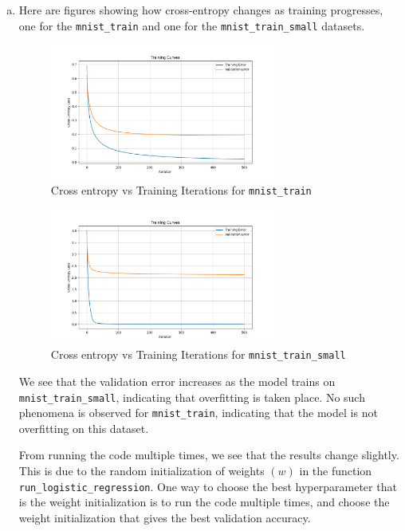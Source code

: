 \documentclass{article}
\begin{document}
\begin{enumerate}[3.1]
\begin{enumerate}[(a)]
        \item Here are figures showing how cross-entropy changes as training progresses, one for the \texttt{mnist\_train} and one for the \texttt{mnist\_train\_small} datasets.
        
        \begin{figure}[H]
            \centering
            \includegraphics[width=0.7\textwidth]{../figures/mnist_train.png}
            \caption{Cross entropy vs Training Iterations for \texttt{mnist\_train}}
            \label{fig:q3b_mnist_train_cross_entropy}
        \end{figure}

        \begin{figure}[H]
            \centering
            \includegraphics[width=0.7\textwidth]{../figures/mnist_train_small.png}
            \caption{Cross entropy vs Training Iterations for \texttt{mnist\_train\_small}}
            \label{fig:q3b_mnist_train_small_cross_entropy}
        \end{figure}

        We see that the validation error increases as the model trains on \texttt{mnist\_train\_small}, indicating that overfitting is taken place. No such phenomena is observed for \texttt{mnist\_train}, indicating that the model is not overfitting on this dataset.

        From running the code multiple times, we see that the results change slightly. This is due to the random initialization of weights $(w)$ in the function \texttt{run\_logistic\_regression}. One way to choose the best hyperparameter that is the weight initialization is to run the code multiple times, and choose the weight initialization that gives the best validation accuracy.

    \end{enumerate}
\end{enumerate}
\end{document}
